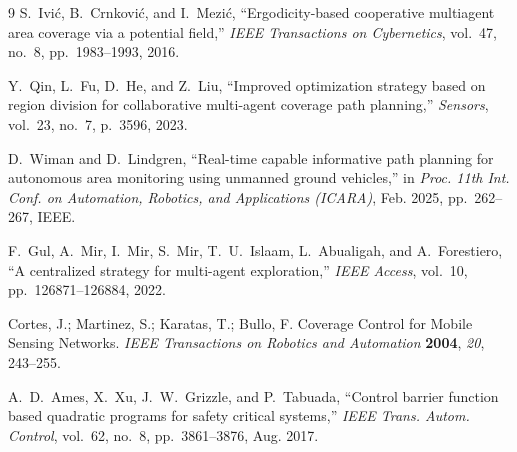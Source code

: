 \documentclass[fleqn,10pt,twocolumn]{main}
\begin{document}
\begin{thebibliography}{9}
S.~Ivić, B.~Crnković, and I.~Mezić, ``Ergodicity-based cooperative multiagent area coverage via a potential field,'' \emph{IEEE Transactions on Cybernetics}, vol.~47, no.~8, pp.~1983--1993, 2016.

Y.~Qin, L.~Fu, D.~He, and Z.~Liu, ``Improved optimization strategy based on region division for collaborative multi-agent coverage path planning,'' \emph{Sensors}, vol.~23, no.~7, p.~3596, 2023.

D.~Wiman and D.~Lindgren, ``Real-time capable informative path planning for autonomous area monitoring using unmanned ground vehicles,'' in \emph{Proc. 11th Int. Conf. on Automation, Robotics, and Applications (ICARA)}, Feb. 2025, pp.~262--267, IEEE.

F.~Gul, A.~Mir, I.~Mir, S.~Mir, T.~U.~Islaam, L.~Abualigah, and A.~Forestiero, ``A centralized strategy for multi-agent exploration,'' \emph{IEEE Access}, vol.~10, pp.~126871--126884, 2022.





Cortes, J.; Martinez, S.; Karatas, T.; Bullo, F. Coverage Control for Mobile Sensing Networks. 
\textit{IEEE Transactions on Robotics and Automation} \textbf{2004}, \textit{20}, 243--255.


A.~D.~Ames, X.~Xu, J.~W.~Grizzle, and P.~Tabuada, ``Control barrier function based quadratic programs for safety critical systems,'' \emph{IEEE Trans. Autom. Control}, vol.~62, no.~8, pp.~3861--3876, Aug. 2017.


\end{thebibliography}
\end{document}
